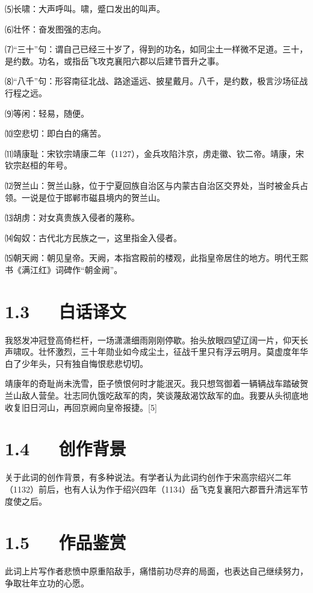 \documentclass[letterpaper,12pt,english]{sphinxmanual}
\begin{document}
⑸长啸：大声呼叫。啸，蹙口发出的叫声。

⑹壮怀：奋发图强的志向。

⑺“三十”句：谓自己已经三十岁了，得到的功名，如同尘土一样微不足道。三十，是约数。功名，或指岳飞攻克襄阳六郡以后建节晋升之事。

⑻“八千”句：形容南征北战、路途遥远、披星戴月。八千，是约数，极言沙场征战行程之远。

⑼等闲：轻易，随便。

⑽空悲切：即白白的痛苦。

⑾靖康耻：宋钦宗靖康二年（1127），金兵攻陷汴京，虏走徽、钦二帝。靖康，宋钦宗赵桓的年号。

⑿贺兰山：贺兰山脉，位于宁夏回族自治区与内蒙古自治区交界处，当时被金兵占领。一说是位于邯郸市磁县境内的贺兰山。

⒀胡虏：对女真贵族入侵者的蔑称。

⒁匈奴：古代北方民族之一，这里指金入侵者。

⒂朝天阙：朝见皇帝。天阙，本指宫殿前的楼观，此指皇帝居住的地方。明代王熙书《满江红》词碑作“朝金阙”。


\section{1.3   白话译文}
\label{\detokenize{p01_u6563_u6587/_u5cb3_u98de-_u6ee1_u6c5f_u7ea2_xb7_u6012_u53d1_u51b2_u51a0:id5}}
我怒发冲冠登高倚栏杆，一场潇潇细雨刚刚停歇。抬头放眼四望辽阔一片，仰天长声啸叹。壮怀激烈，三十年勋业如今成尘土，征战千里只有浮云明月。莫虚度年华白了少年头，只有独自悔恨悲悲切切。

靖康年的奇耻尚未洗雪，臣子愤恨何时才能泯灭。我只想驾御着一辆辆战车踏破贺兰山敌人营垒。壮志同仇饿吃敌军的肉，笑谈蔑敌渴饮敌军的血。我要从头彻底地收复旧日河山，再回京阙向皇帝报捷。{[}5{]}


\section{1.4   创作背景}
\label{\detokenize{p01_u6563_u6587/_u5cb3_u98de-_u6ee1_u6c5f_u7ea2_xb7_u6012_u53d1_u51b2_u51a0:id6}}
关于此词的创作背景，有多种说法。有学者认为此词约创作于宋高宗绍兴二年（1132）前后，也有人认为作于绍兴四年（1134）岳飞克复襄阳六郡晋升清远军节度使之后。


\section{1.5   作品鉴赏}
\label{\detokenize{p01_u6563_u6587/_u5cb3_u98de-_u6ee1_u6c5f_u7ea2_xb7_u6012_u53d1_u51b2_u51a0:id7}}
此词上片写作者悲愤中原重陷敌手，痛惜前功尽弃的局面，也表达自己继续努力，争取壮年立功的心愿。
\end{document}
